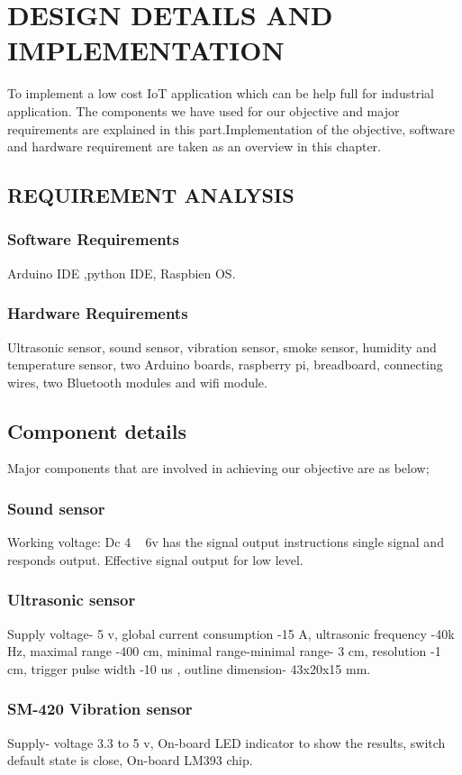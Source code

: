 \chapter{DESIGN DETAILS AND IMPLEMENTATION}
To implement a low cost IoT application which can be help full for industrial application. The components we have used for our objective and major requirements are explained in this part.Implementation of the objective, software and hardware requirement are taken as an overview in this chapter.

\section{REQUIREMENT ANALYSIS}
\subsection {Software Requirements}
Arduino IDE ,python IDE, Raspbien OS. 
 \subsection{Hardware Requirements}
Ultrasonic sensor, sound sensor, vibration sensor, smoke sensor, humidity and temperature sensor, two Arduino boards, raspberry pi, breadboard, connecting wires, two Bluetooth modules and wifi module.  



\section{Component details}
Major components that are involved in achieving our objective are as below;
\subsection{Sound sensor }  Working voltage: Dc 4 ~ 6v has the signal output instructions single signal and responds output. Effective signal output for low level. 

\subsection{Ultrasonic sensor} Supply voltage- 5 v, global current consumption -15 A, ultrasonic frequency -40k Hz, maximal range -400 cm, minimal range-minimal range- 3 cm, resolution -1 cm, trigger pulse width -10 us , outline dimension- 43x20x15 mm.

\subsection{SM-420 Vibration sensor }
Supply- voltage 3.3 to 5 v, On-board LED indicator to show the results, switch default state is close, On-board LM393 chip. 


